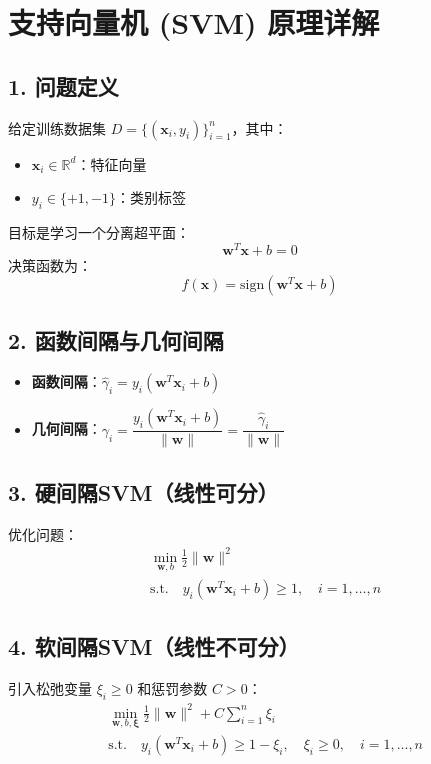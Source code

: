\documentclass{article}
\begin{document}
	
	\section*{支持向量机 (SVM) 原理详解}
	
	\subsection*{1. 问题定义}
	给定训练数据集 \( D = \{ (\mathbf{x}_i, y_i) \}_{i=1}^n \)，其中：
	\begin{itemize}
		\item \( \mathbf{x}_i \in \mathbb{R}^d \)：特征向量
		\item \( y_i \in \{+1, -1\} \)：类别标签
	\end{itemize}
	目标是学习一个分离超平面：
	\[
	\mathbf{w}^T \mathbf{x} + b = 0
	\]
	决策函数为：
	\[
	f(\mathbf{x}) = \text{sign}(\mathbf{w}^T \mathbf{x} + b)
	\]
	
	\subsection*{2. 函数间隔与几何间隔}
	\begin{itemize}
		\item \textbf{函数间隔}：\(\hat{\gamma}_i = y_i (\mathbf{w}^T \mathbf{x}_i + b)\)
		\item \textbf{几何间隔}：\(\gamma_i = \dfrac{y_i (\mathbf{w}^T \mathbf{x}_i + b)}{\|\mathbf{w}\|} = \dfrac{\hat{\gamma}_i}{\|\mathbf{w}\|}\)
	\end{itemize}
	
	\subsection*{3. 硬间隔SVM（线性可分）}
	优化问题：
	\[
	\begin{aligned}
		& \min_{\mathbf{w}, b} \frac{1}{2} \|\mathbf{w}\|^2 \\
		& \text{s.t.} \quad y_i (\mathbf{w}^T \mathbf{x}_i + b) \geq 1, \quad i = 1, \dots, n
	\end{aligned}
	\]
	
	\subsection*{4. 软间隔SVM（线性不可分）}
	引入松弛变量 \(\xi_i \geq 0\) 和惩罚参数 \(C > 0\)：
	\[
	\begin{aligned}
		& \min_{\mathbf{w}, b, \boldsymbol{\xi}} \frac{1}{2} \|\mathbf{w}\|^2 + C \sum_{i=1}^n \xi_i \\
		& \text{s.t.} \quad y_i (\mathbf{w}^T \mathbf{x}_i + b) \geq 1 - \xi_i, \quad \xi_i \geq 0, \quad i = 1, \dots, n
	\end{aligned}
	\]
	
\end{document}
